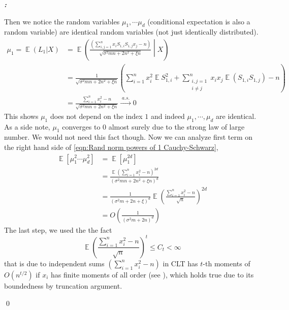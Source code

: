 \documentclass[12pt]{extarticle}
\renewenvironment{proof}[1][\proofname]{ { \it\bfseries #1: }}{\qed}
\newcommand{\1}{\field{1}}
\DeclareMathOperator{\E}{\mathbb{E}}
\numberwithin{equation}{section}
\begin{document}
\begin{proof}
\begin{enumerate}[label={(\arabic*)}]
Then we notice the random variables $\mu_1, \cdots \mu_d$  (conditional expectation is also a random variable) are identical random variables (not just identically distributed).
\begin{align*}
  \mu_1 = \E \left( L_1| X\right)
  & = \E \left(  \frac{(\sum_{i,j=1}^n x_i S_{1,i} S_{1,j}x_j -n)}{\sqrt{\sigma^2 mn+2n^2 + \xi n}} \middle| X\right) \\
  & = \frac{1}{\sqrt{\sigma^2 mn+2n^2 + \xi n}}\left(  \sum_{i=1}^n x_i^2 \E S_{1,i}^2 +\sum_{\substack{i,j=1\\i\ne j}}^n x_ix_j \E(S_{1,i} S_{1,j}) -n \right) \\
  & = \frac{\sum_{i=1}^n x_i^2 -n}{\sqrt{\sigma^2 mn+2n^2 + \xi n}} \xrightarrow[]{\;a.s.\;} 0
\end{align*}
This shows $\mu_1$ does not depend on the index $1$ and indeed $\mu_1, \cdots, \mu_d$ are identical. As a side note, $\mu_1$ converges to 0 almost surely due to the strong law of large number. We would not need this fact though. Now we can analyze first term on the right hand side of \cref{eqn:Rand norm powers of 1 Cauchy-Schwarz},
\begin{align}
  \E \left[\mu_1^2 \cdots \mu_d^2 \right]
  & = \E \left[\mu_1^{2d}  \right] \nonumber \\
  & = \frac{\E \left(\sum_{i=1}^n x_i^2 -n\right)^{2d}}{ \left(\sigma^2 mn+2n^2 + \xi n \right)^{d} } \nonumber \\
  & = \frac{1}{ \left(\sigma^2 m+2n + \xi \right)^{d} }  \E \left(\frac{\sum_{i=1}^n x_i^2 -n}{\sqrt{n}}\right)^{2d} \nonumber \\
  &= O\left(\frac{1}{(\sigma^2 m+2n)^d}\right) \label{eqn: cauchy-schwarz L1 bound}
\end{align}
The last step, we used the the fact
\[
\E \left(\frac{\sum_{i=1}^n x_i^2 -n}{\sqrt{n}}\right)^{t} \le C_t <\infty
\]
that is due to independent sums $({\sum_{i=1}^n x_i^2 -n})$ in CLT has $t$-th moments of $O(n^{t/2})$ if $x_i$ has finite moments of all order (see \cite{brillinger1962note, von1965convergence}), which holds true due to its boundedness by truncation argument. 




\end{enumerate}
\end{proof}
\end{document}
